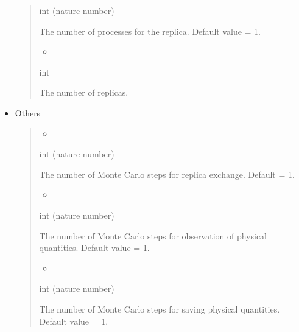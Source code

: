 \documentclass[letterpaper,10pt,english]{sphinxmanual}
\begin{document}
\begin{itemize}
\begin{quote}
 int (nature number)

 The number of processes for the replica. Default value = 1.
\begin{itemize}
\item {} 

\end{itemize}

 int

 The number of replicas.
\end{quote}

\item {} 
Others
\begin{quote}
\begin{itemize}
\item {} 

\end{itemize}

 int (nature number)

 The number of Monte Carlo steps for replica exchange. Default = 1.
\begin{itemize}
\item {} 

\end{itemize}

 int (nature number)

     The number of Monte Carlo steps for observation of physical quantities. Default value = 1.
\begin{itemize}
\item {} 

\end{itemize}

 int (nature number)

     The number of Monte Carlo steps for saving physical quantities. Default value = 1.
\end{quote}

\end{itemize}
\end{document}
